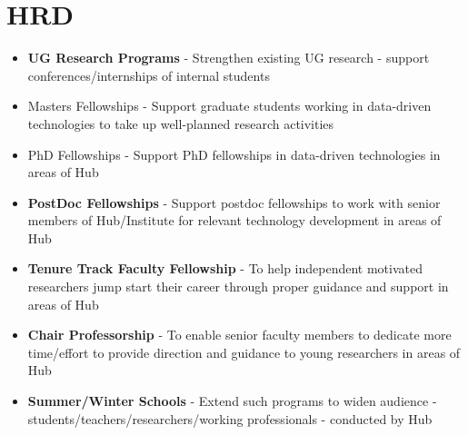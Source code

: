\documentclass[aspectratio=169]{beamer}
\begin{document}
\section{\textbf{HRD}}

\begin{frame}[fragile=singleslide]{}
\begin{center}
\begin {itemize}
\item {\textbf{UG Research Programs}} - Strengthen existing UG research - support conferences/internships of internal students
\item {Masters Fellowships} - Support graduate students working in data-driven technologies to take up well-planned research activities
\item {PhD Fellowships} - Support PhD fellowships in data-driven technologies in areas of Hub
\item {\textbf{PostDoc Fellowships}} - Support postdoc fellowships to work with senior members of Hub/Institute for relevant technology development in areas of Hub
\item {\textbf{Tenure Track Faculty Fellowship}} - To help independent motivated researchers jump start their career through proper guidance and support in areas of Hub
\item {\textbf{Chair Professorship}} - To enable senior faculty members to dedicate more time/effort to provide direction and guidance to  young researchers in areas of Hub
\item {\textbf{Summer/Winter Schools}} - Extend such programs to widen audience - students/teachers/researchers/working professionals - conducted by Hub
\end{itemize}
\end{center}
\end{frame}
\end{document}
